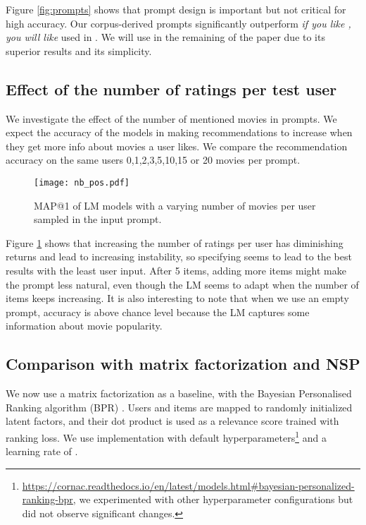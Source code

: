 \documentclass[runningheads]{llncs}
\begin{document}
Figure \ref{fig:prompts} shows that prompt design is important but not critical for high accuracy. Our corpus-derived prompts significantly outperform \textit{if you like , you will like } used in \cite{Penha20}. We will use  in the remaining of the paper due to its superior results and its simplicity.

\subsection{Effect of the number of ratings per test user}
We investigate the effect of the number of mentioned movies in prompts. We expect the accuracy of the models in making recommendations to increase when they get more info about movies a user likes. We compare the recommendation accuracy on the same users 0,1,2,3,5,10,15 or 20 movies per prompt. 

\begin{figure}\centering
    \texttt{[image: nb\_pos.pdf]}
    \caption{MAP@1 of LM models with a varying number of movies per user sampled in the input prompt.}
    \label{ratingsperuser}
\end{figure}

Figure \ref{ratingsperuser} shows that increasing the number of ratings per user has diminishing returns and lead to increasing instability, so specifying  seems to lead to the best results with the least user input. After 5 items, adding more items might make the prompt less natural, even though the LM seems to adapt when the number of items keeps increasing. It is also interesting to note that when we use an empty prompt, accuracy is above chance level because the LM captures some information about movie popularity.


\subsection{Comparison with matrix factorization and NSP}

We now use a matrix factorization as a baseline, with the Bayesian Personalised Ranking algorithm (BPR) \cite{rendle2012bpr}. Users and items are mapped to  randomly initialized latent factors, and their dot product is used as a relevance score trained with ranking loss. We use \cite{salah2020cornac} implementation with default hyperparameters\footnote{\url{https://cornac.readthedocs.io/en/latest/models.html\#bayesian-personalized-ranking-bpr}, we experimented with other hyperparameter configurations but did not observe significant changes.}  and a learning rate of .
\end{document}
